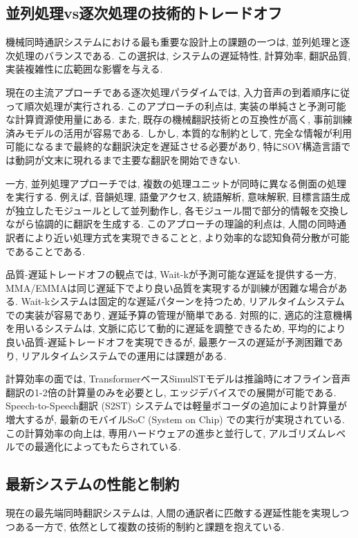 \subsection{並列処理vs逐次処理の技術的トレードオフ}

機械同時通訳システムにおける最も重要な設計上の課題の一つは, 並列処理と逐次処理のバランスである.
この選択は, システムの遅延特性, 計算効率, 翻訳品質, 実装複雑性に広範囲な影響を与える.

現在の主流アプローチである逐次処理パラダイムでは, 入力音声の到着順序に従って順次処理が実行される.
このアプローチの利点は, 実装の単純さと予測可能な計算資源使用量にある.
また, 既存の機械翻訳技術との互換性が高く, 事前訓練済みモデルの活用が容易である.
しかし, 本質的な制約として, 完全な情報が利用可能になるまで最終的な翻訳決定を遅延させる必要があり, 特にSOV構造言語では動詞が文末に現れるまで主要な翻訳を開始できない.

一方, 並列処理アプローチでは, 複数の処理ユニットが同時に異なる側面の処理を実行する.
例えば, 音韻処理, 語彙アクセス, 統語解析, 意味解釈, 目標言語生成が独立したモジュールとして並列動作し, 各モジュール間で部分的情報を交換しながら協調的に翻訳を生成する.
このアプローチの理論的利点は, 人間の同時通訳者により近い処理方式を実現できることと, より効率的な認知負荷分散が可能であることである.

品質-遅延トレードオフの観点では, Wait-kが予測可能な遅延を提供する一方, MMA/EMMAは同じ遅延下でより良い品質を実現するが訓練が困難な場合がある.
Wait-kシステムは固定的な遅延パターンを持つため, リアルタイムシステムでの実装が容易であり, 遅延予算の管理が簡単である.
対照的に, 適応的注意機構を用いるシステムは, 文脈に応じて動的に遅延を調整できるため, 平均的により良い品質-遅延トレードオフを実現できるが, 最悪ケースの遅延が予測困難であり, リアルタイムシステムでの運用には課題がある.

計算効率の面では, TransformerベースSimulSTモデルは推論時にオフライン音声翻訳の1-2倍の計算量のみを必要とし, エッジデバイスでの展開が可能である.
Speech-to-Speech翻訳 (S2ST) システムでは軽量ボコーダの追加により計算量が増大するが, 最新のモバイルSoC (System on Chip) での実行が実現されている.
この計算効率の向上は, 専用ハードウェアの進歩と並行して, アルゴリズムレベルでの最適化によってもたらされている.

\subsection{最新システムの性能と制約}

現在の最先端同時翻訳システムは, 人間の通訳者に匹敵する遅延性能を実現しつつある一方で, 依然として複数の技術的制約と課題を抱えている.

